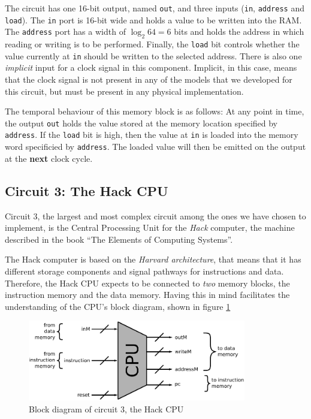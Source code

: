         The circuit has one 16-bit output, named \texttt{out}, and three inputs (\texttt{in},
        \texttt{address} and \texttt{load}). The \texttt{in} port is 16-bit wide and holds a value
        to be written into the RAM. The \texttt{address} port has a width of $\log_{2} 64 = 6$ bits
        and holds the address in which reading or writing is to be performed. Finally, the
        \texttt{load} bit controls whether the value currently at \texttt{in} should be written to
        the selected address. There is also one \emph{implicit} input for a clock signal in this
        component.  Implicit, in this case, means that the clock signal is not present in any of the
        models that we developed for this circuit, but must be present in any physical
        implementation.

        The temporal behaviour of this memory block is as follows: At any point in time, the output
        \texttt{out} holds the value stored at the memory location specified by \texttt{address}.
        If the \texttt{load} bit is high, then the value at \texttt{in} is loaded into the memory
        word specificied by \texttt{address}. The loaded value will then be emitted on the output at
        the \textbf{next} clock cycle.

    \subsection{Circuit 3: The Hack CPU}
    \label{subsec:hack-cpu-circuit}

        Circuit 3, the largest and most complex circuit among the ones we have chosen to implement,
        is the Central Processing Unit for the \emph{Hack} computer, the machine described in the
        book ``The Elements of Computing Systems''\cite{nand2tetris-book}.

        The Hack computer is based on the \emph{Harvard architecture}, that means that it has
        different storage components and signal pathways for instructions and data. Therefore, the
        Hack CPU expects to be connected to \emph{two} memory blocks, the instruction memory and the
        data memory. Having this in mind facilitates the understanding of the CPU's block diagram,
        shown in figure \ref{fig:cpu-block}

        \begin{figure}[H]
            \centerline{\includegraphics[width=0.85\textwidth]{imgs/cpu-block.pdf}}
            \caption{Block diagram of circuit 3, the Hack CPU
                \label{fig:cpu-block}}
        \end{figure}

